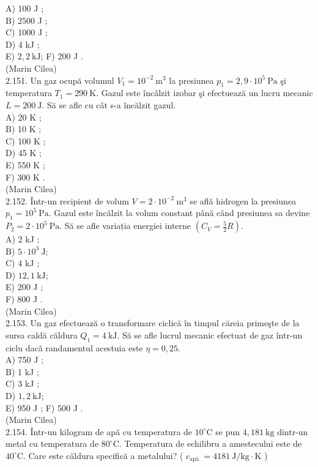 \documentclass[10pt]{article}
\begin{document}
A) 100 J ;\\
B) 2500 J ;\\
C) 1000 J ;\\
D) 4 kJ ;\\
E) $2,2 \mathrm{~kJ}$; F) 200 J .\\
(Marin Cilea)\\
2.151. Un gaz ocupă volumul $V_{1}=10^{-2} \mathrm{~m}^{3}$ la presiunea $p_{1}=2,9 \cdot 10^{5} \mathrm{~Pa}$ şi temperatura $T_{1}=290 \mathrm{~K}$. Gazul este încǎlzit izobar şi efectuează un lucru mecanic $L=200 \mathrm{~J}$. Să se afle cu cât s-a încălzit gazul.\\
A) 20 K ;\\
B) 10 K ;\\
C) 100 K ;\\
D) 45 K ;\\
E) 550 K ;\\
F) 300 K .\\
(Marin Cilea)\\
2.152. Într-un recipient de volum $V=2 \cdot 10^{-2} \mathrm{~m}^{3}$ se află hidrogen la presiunea $p_{1}=10^{5} \mathrm{~Pa}$. Gazul este încălzit la volum constant până când presiunea sa devine $P_{2}=2 \cdot 10^{5} \mathrm{~Pa}$. Să se afle variația energiei interne $\left(C_{V}=\frac{5}{2} R\right)$.\\
A) 2 kJ ;\\
B) $5 \cdot 10^{3} \mathrm{~J}$;\\
C) 4 kJ ;\\
D) $12,1 \mathrm{~kJ}$;\\
E) 200 J ;\\
F) 800 J .\\
(Marin Cilea)\\
2.153. Un gaz efectuează o transformare ciclică în timpul căreia primeşte de la sursa caldă căldura $Q_{1}=4 \mathrm{~kJ}$. Să se afle lucrul mecanic efectuat de gaz într-un ciclu dacã randamentul acestuia este $\eta=0,25$.\\
A) 750 J ;\\
B) 1 kJ ;\\
C) 3 kJ ;\\
D) $1,2 \mathrm{~kJ}$;\\
E) 950 J ; F) 500 J .\\
(Marin Cilea)\\
2.154. Într-un kilogram de apă cu temperatura de $10^{\circ} \mathrm{C}$ se pun $4,181 \mathrm{~kg}$ dintr-un metal cu temperatura de $80^{\circ} \mathrm{C}$. Temperatura de echilibru a amestecului este de $40^{\circ} \mathrm{C}$. Care este căldura specifică a metalului? ( $c_{\text {apă }}=4181 \mathrm{~J} / \mathrm{kg} \cdot \mathrm{K}$ )\\
\end{document}
